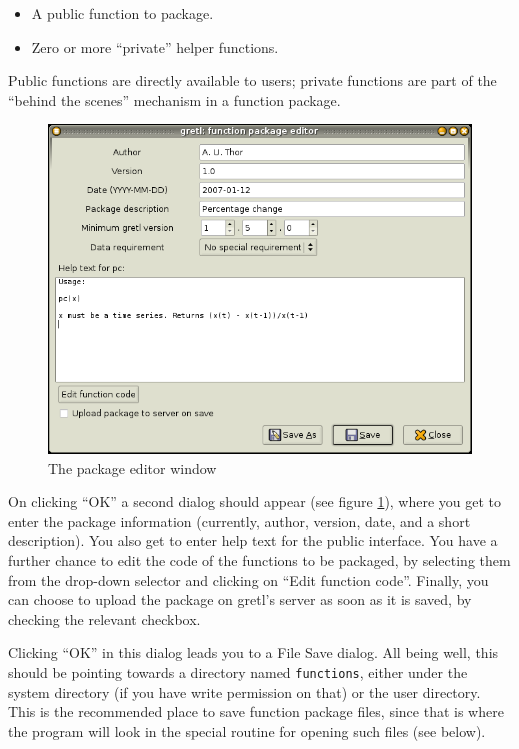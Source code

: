 \begin{itemize}
\item A public function to package.
\item Zero or more ``private'' helper functions.
\end{itemize}

Public functions are directly available to users; private functions are
part of the ``behind the scenes'' mechanism in a function package.

\begin{figure}[htbp]
  \centering
  \includegraphics[scale=0.5]{figures/package_editor}
  \caption{The package editor window}
  \label{fig:package_editor}
\end{figure}

On clicking ``OK'' a second dialog should appear (see figure
\ref{fig:package_editor}), where you get to enter the package
information (currently, author, version, date, and a short
description).  You also get to enter help text for the public
interface.  You have a further chance to edit the code of the
functions to be packaged, by selecting them from the drop-down
selector and clicking on ``Edit function code''. Finally, you can
choose to upload the package on gretl's server as soon as it is saved,
by checking the relevant checkbox.

Clicking ``OK'' in this dialog leads you to a File Save dialog.  All
being well, this should be pointing towards a directory named
\texttt{functions}, either under the  system directory (if
you have write permission on that) or the  user directory.
This is the recommended place to save function package files, since
that is where the program will look in the special routine for opening
such files (see below).

